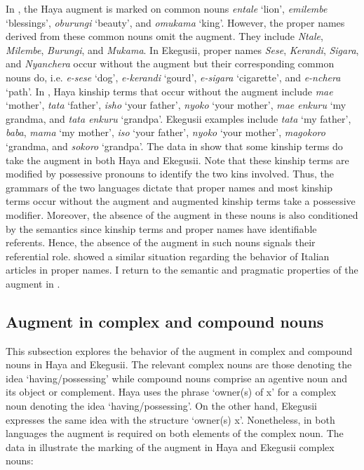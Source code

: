 \documentclass[output=paper]{langscibook}
\begin{document}
\begin{sloppypar}\noindent In , the Haya augment is marked on common nouns \textit{entale} ‘lion’, \textit{emilembe} ‘blessings’, \textit{oburungi} ‘beauty’, and \textit{omukama} ‘king’. However, the proper names derived from these common nouns omit the augment. They include \textit{Ntale}, \textit{Milembe}, \textit{Burungi}, and \textit{Mukama}. In Ekegusii, proper names \textit{Sese}, \textit{Kerandi}, \textit{Sigara}, and \textit{Nyanchera} occur without the augment but their corresponding common nouns do, i.e. \textit{e-sese} ‘dog’, \textit{e-kerandi} ‘gourd’, \textit{e-sigara} ‘cigarette’, and \textit{e-nchera} ‘path’. In , Haya kinship terms that occur without the augment include \textit{mae} ‘mother’, \textit{tata} ‘father’, \textit{isho} ‘your father’, \textit{nyoko} ‘your mother’, \textit{mae enkuru} ‘my grandma, and \textit{tata enkuru} ‘grandpa’. Ekegusii examples include \textit{tata} ‘my father’, \textit{baba}, \textit{mama} ‘my mother’, \textit{iso} ‘your father’, \textit{nyoko} ‘your mother’, \textit{magokoro} ‘grandma, and \textit{sokoro} ‘grandpa’. The data in  show that some kinship terms do take the augment in both Haya and Ekegusii. Note that these kinship terms are modified by possessive pronouns to identify the two kins involved. Thus, the grammars of the two languages dictate that proper names and most kinship terms occur without the augment and augmented kinship terms take a possessive modifier. Moreover, the absence of the augment in these nouns is also conditioned by the semantics since kinship terms and proper names have identifiable referents. Hence, the absence of the augment in such nouns signals their referential role. \citet{longobardi1994reference} showed a similar situation regarding the behavior of Italian articles in proper names. I return to the semantic and pragmatic properties of the augment in .\end{sloppypar}


\subsection{Augment in complex and compound nouns}
This subsection explores the behavior of the augment in complex and compound nouns in Haya and Ekegusii. The relevant complex nouns are those denoting the idea `having/possessing' while compound nouns comprise an agentive noun and its object or complement. Haya uses the phrase ‘owner(s) of x’ for a complex noun denoting the idea `having/possessing'. On the other hand, Ekegusii expresses the same idea with the structure ‘owner(s) x’. Nonetheless, in both languages the augment is required on both elements of the complex noun. The data in  illustrate the marking of the augment in Haya and Ekegusii complex nouns:
\end{document}
